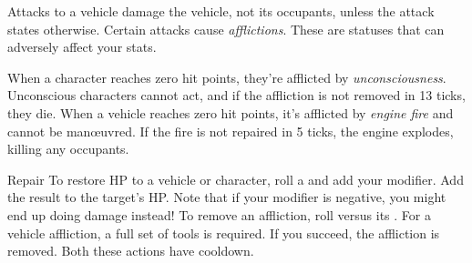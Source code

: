 
Attacks to a vehicle damage the vehicle, not its occupants, unless the attack states otherwise. Certain attacks cause \emph{afflictions}. These are statuses that can adversely affect your stats.

When a character reaches zero hit points, they're afflicted by \emph{unconsciousness}. Unconscious characters cannot act, and if the affliction is not removed in 13 ticks, they die. When a vehicle reaches zero hit points, it's afflicted by \emph{engine fire} and cannot be man\oe{}uvred. If the fire is not repaired in 5 ticks, the engine explodes, killing any occupants.

\begin{abstractsection}{Repair}
To restore HP to a vehicle or character, roll a  and add your  modifier. Add the result to the target's HP. Note that if your modifier is negative, you might end up doing damage instead! To remove an affliction, roll  versus its . For a vehicle affliction, a full set of tools is required. If you succeed, the affliction is removed. Both these actions have  cooldown.
\end{abstractsection}

